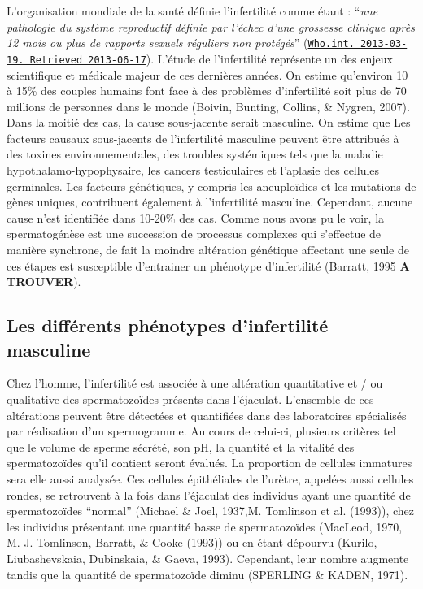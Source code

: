 \documentclass[12pt,twoside]{reedthesis}
\theoremstyle{definition}
\theoremstyle{definition}
\theoremstyle{remark}
\begin{document}
  L'organisation mondiale de la santé définie l'infertilité comme étant :
  ``\emph{une pathologie du système reproductif définie par l'échec d'une
  grossesse clinique après 12 mois ou plus de rapports sexuels réguliers
  non protégés}''
  (\href{http://www.who.int/reproductivehealth/topics/infertility/definitions/en/}{\texttt{Who.int.\ 2013-03-19.\ Retrieved\ 2013-06-17}}).
  L'étude de l'infertilité représente un des enjeux scientifique et
  médicale majeur de ces dernières années. On estime qu'environ 10 à 15\%
  des couples humains font face à des problèmes d'infertilité soit plus de
  70 millions de personnes dans le monde (Boivin, Bunting, Collins, \&
  Nygren, 2007). Dans la moitié des cas, la cause sous-jacente serait
  masculine. On estime que Les facteurs causaux sous-jacents de
  l'infertilité masculine peuvent être attribués à des toxines
  environnementales, des troubles systémiques tels que la maladie
  hypothalamo-hypophysaire, les cancers testiculaires et l'aplasie des
  cellules germinales. Les facteurs génétiques, y compris les aneuploïdies
  et les mutations de gènes uniques, contribuent également à l'infertilité
  masculine. Cependant, aucune cause n'est identifiée dans 10-20\% des
  cas. Comme nous avons pu le voir, la spermatogénèse est une succession
  de processus complexes qui s'effectue de manière synchrone, de fait la
  moindre altération génétique affectant une seule de ces étapes est
  susceptible d'entrainer un phénotype d'infertilité (Barratt, 1995
  \textbf{A TROUVER}).
  
  \subsection{Les différents phénotypes d'infertilité
  masculine}\label{les-differents-phenotypes-dinfertilite-masculine}
  
  Chez l'homme, l'infertilité est associée à une altération quantitative
  et / ou qualitative des spermatozoïdes présents dans l'éjaculat.
  L'ensemble de ces altérations peuvent être détectées et quantifiées dans
  des laboratoires spécialisés par réalisation d'un spermogramme. Au cours
  de celui-ci, plusieurs critères tel que le volume de sperme sécrété, son
  pH, la quantité et la vitalité des spermatozoïdes qu'il contient seront
  évalués. La proportion de cellules immatures sera elle aussi analysée.
  Ces cellules épithéliales de l'urètre, appelées aussi cellules rondes,
  se retrouvent à la fois dans l'éjaculat des individus ayant une quantité
  de spermatozoïdes ``normal'' (Michael \& Joel, 1937,M. Tomlinson et al.
  (1993)), chez les individus présentant une quantité basse de
  spermatozoïdes (MacLeod, 1970, M. J. Tomlinson, Barratt, \& Cooke
  (1993)) ou en étant dépourvu (Kurilo, Liubashevskaia, Dubinskaia, \&
  Gaeva, 1993). Cependant, leur nombre augmente tandis que la quantité de
  spermatozoïde diminu (SPERLING \& KADEN, 1971).
  
\end{document}
